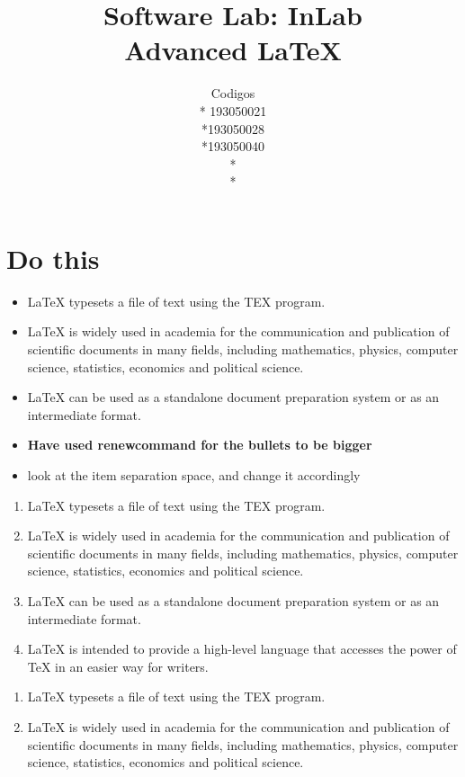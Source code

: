 \documentclass{article}
\title{\textbf{Software Lab: InLab \\
{\Large Advanced \LaTeX{}}}}
\author{Codigos \\* 193050021 \\*193050028 \\*193050040 \\* \\*}
\begin{document}
\maketitle
\thispagestyle{empty}
\newpage
{}
\tableofcontents
\newpage

\section{Do this}
\begin{itemize}[topsep=8pt,itemsep=20pt,partopsep=4pt, parsep=4pt]
    \item \LaTeX{} typesets a file of text using the TEX program.
    \item \LaTeX{}  is widely used in academia for the communication and publication of scientific documents in many fields, including mathematics, physics, computer science, statistics, economics and political science.
    \item \LaTeX{} can be used as a standalone document preparation system or as an intermediate format.
    \item \textbf{Have used renewcommand for the bullets to be bigger}
    \item look at the item separation space, and change it accordingly
\end{itemize}
\renewcommand{\theenumi}{\Roman{enumi}}
\begin{enumerate}
    \item \LaTeX{} typesets a file of text using the TEX program.
    \item \LaTeX{} is widely used in academia for the communication and publication of scientific documents in many fields, including mathematics, physics, computer science, statistics, economics and political science.
    \item \LaTeX{} can be used as a standalone document preparation system or as an intermediate format.
    \item \LaTeX{} is intended to provide a high-level language that accesses the power of TeX in an easier way for writers.
\end{enumerate}
\begin{enumerate}[label=(\alph*)]
    \item \LaTeX{} typesets a file of text using the TEX program.
    \item \LaTeX{} is widely used in academia for the communication and publication of scientific documents in many fields, including mathematics, physics, computer science, statistics, economics and political science.
\end{enumerate} 
\end{document}
